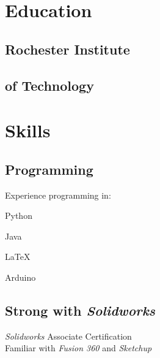 \documentclass[12pt,letterpaper]{deedy-resume} %
\begin{document}
\begin{minipage}[t]{0.49\textwidth} %


\section{Education} 

\subsection{Rochester Institute}
\subsection{of Technology}


\sectionspace %
\sectionspace

\section{Skills}

\subsection{Programming}
Experience programming in:
\sectionspace
\begin{tightitemize}
\item Python %
\item Java
\item \LaTeX %
\item Arduino
\end{tightitemize}

\sectionspace

\subsection{Strong with \textit{Solidworks}}
\begin{tightitemize}
\item \textit{Solidworks} Associate Certification\\Familiar with \textit{Fusion 360} and \textit{Sketchup}
\end{tightitemize}


\end{minipage}
\end{document}
